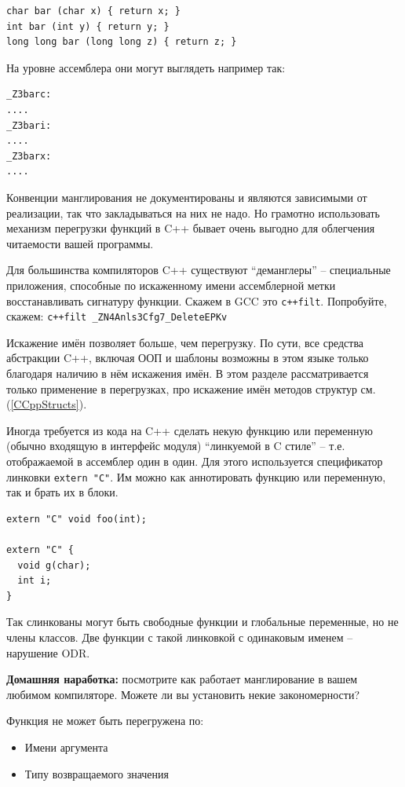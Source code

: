 \documentclass[a4paper,12pt,oneside]{book}
\begin{document}
\begin{lstlisting}
char bar (char x) { return x; }
int bar (int y) { return y; }
long long bar (long long z) { return z; }
\end{lstlisting}

На уровне ассемблера они могут выглядеть например так:

\begin{verbatim}
_Z3barc:
....
_Z3bari:
....
_Z3barx:
....
\end{verbatim}

Конвенции манглирования не документированы и являются зависимыми от реализации, так что закладываться на них не надо. Но грамотно использовать механизм перегрузки функций в C++ бывает очень выгодно для облегчения читаемости вашей программы.

Для большинства компиляторов C++ существуют ``деманглеры'' -- специальные приложения, способные по искаженному имени ассемблерной метки восстанавливать сигнатуру функции. Скажем в GCC это \lstinline!c++filt!. Попробуйте, скажем: \lstinline!c++filt _ZN4Anls3Cfg7_DeleteEPKv!

Искажение имён позволяет больше, чем перегрузку. По сути, все средства абстракции C++, включая ООП и шаблоны возможны в этом языке только благодаря наличию в нём искажения имён. В этом разделе рассматривается только применение в перегрузках, про искажение имён методов структур см. (\ref{CCppStructs}).

Иногда требуется из кода на C++ сделать некую функцию или переменную (обычно входящую в интерфейс модуля) ``линкуемой в C стиле'' -- т.е. отображаемой в ассемблер один в один. Для этого используется спецификатор линковки \lstinline!extern "C"!. Им можно как аннотировать функцию или переменную, так и брать их в блоки.

\begin{lstlisting}
extern "C" void foo(int);

extern "C" {
  void g(char);
  int i;
}
\end{lstlisting}

Так слинкованы могут быть свободные функции и глобальные переменные, но не члены классов. Две функции с такой линковкой с одинаковым именем -- нарушение ODR.

\textbf{Домашняя наработка:} посмотрите как работает манглирование в вашем любимом компиляторе. Можете ли вы установить некие закономерности?

Функция не может быть перегружена по: 

\begin{itemize}
\item Имени аргумента
\item Типу возвращаемого значения
\end{itemize}
\end{document}
